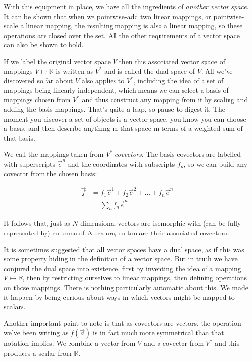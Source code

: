 With this equipment in place, we have all the ingredients of \textit{another vector space}. It can be shown that when we pointwise-add two linear mappings, or pointwise-scale a linear mapping, the resulting mapping is also a linear mapping, so these operations are closed over the set. All the other requirements of a vector space can also be shown to hold.

If we label the original vector space $V$ then this associated vector space of mappings $V \mapsto \mathbb{R}$ is written as $V^*$ and is called the dual space of $V$. All we've discovered so far about $V$ also applies to $V^*$, including the idea of a set of mappings being linearly independent, which means we can select a basis of mappings chosen from $V^*$ and thus construct any mapping from it by scaling and adding the basis mappings. That's quite a leap, so pause to digest it. The moment you discover a set of objects is a vector space, you know you can choose a basis, and then describe anything in that space in terms of a weighted sum of that basis.

We call the mappings taken from $V^*$ \textit{covectors}. The basis covectors are labelled with superscripts $\vec{e}^n$ and the coordinates with subscripts $f_n$, so we can build any covector from the chosen basis:

\begin{equation}
    \begin{split}
    \vec{f} &= f_1 \vec{e}^1 + f_2 \vec{e}^2 + ... + f_n \vec{e}^n \\
            &= \sum_n f_n \vec{e}^n
    \end{split}
\end{equation}

It follows that, just as $N$-dimensional vectors are isomorphic with (can be fully represented by) columns of $N$ scalars, so too are their associated covectors.

It is sometimes suggested that all vector spaces have a dual space, as if this was some property hiding in the definition of a vector space. But in truth we have conjured the dual space into existence, first by inventing the idea of a mapping $V \mapsto \mathbb{R}$, then by restricting ourselves to linear mappings, then defining operations on those mappings. There is nothing particularly automatic about this. We made it happen by being curious about ways in which vectors might be mapped to scalars.

Another important point to note is that as covectors are vectors, the operation we've been writing as $f(\vec{a})$ is in fact much more symmetrical than that notation implies. We combine a vector from $V$ and a covector from $V^*$ and this produces a scalar from $\mathbb{R}$. 

